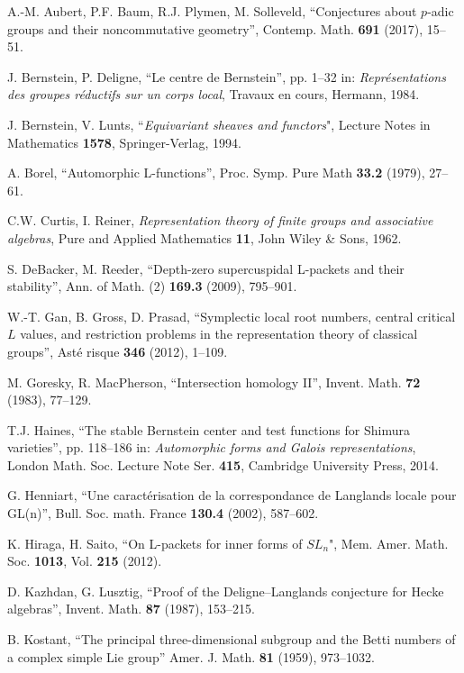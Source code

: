 \documentclass[11pt]{amsart}
\theoremstyle{definition}
\begin{document}
\begin{thebibliography}{99}
 A.-M. Aubert, P.F. Baum, R.J. Plymen, M. Solleveld,
``Conjectures about $p$-adic groups and their noncommutative geometry'',
Contemp. Math. {\bf 691} (2017), 15--51.

 J. Bernstein, P. Deligne,
``Le centre de Bernstein'',
pp. 1--32 in: \emph{Repr\'esentations des groupes r\'eductifs sur un corps local},
Travaux en cours, Hermann, 1984.

 J. Bernstein, V. Lunts,
``\emph{Equivariant sheaves and functors}",
Lecture Notes in Mathematics {\bf 1578}, Springer-Verlag, 1994.

 A. Borel, 
``Automorphic L-functions'',
Proc. Symp. Pure Math {\bf 33.2} (1979), 27--61.

 C.W. Curtis, I. Reiner,
\emph{Representation theory of finite groups and associative algebras},
Pure and Applied Mathematics {\bf 11},
John Wiley \& Sons, 1962.

 S. DeBacker, M. Reeder, 
``Depth-zero supercuspidal L-packets and their stability'', 
Ann. of Math. (2) {\bf 169.3} (2009), 795--901.

 W.-T. Gan, B. Gross, D. Prasad,
``Symplectic local root numbers, central critical $L$ values,
and restriction problems in the representation theory of classical groups'',
Ast\'e risque {\bf 346} (2012), 1--109.

 M. Goresky, R. MacPherson,
``Intersection homology II'',
Invent. Math. {\bf 72} (1983), 77--129.

 T.J. Haines, 
``The stable Bernstein center and test functions for Shimura varieties'',
pp. 118--186 in: \emph{Automorphic forms and Galois representations},
London Math. Soc. Lecture Note Ser. {\bf 415}, Cambridge University Press, 2014.

 G. Henniart, 
``Une caract\'erisation de la correspondance de Langlands locale pour GL(n)'',
Bull. Soc. math. France {\bf 130.4} (2002), 587--602.

 K. Hiraga, H. Saito,
``On L-packets for inner forms of $SL_n$",
Mem. Amer. Math. Soc. {\bf 1013}, Vol. {\bf 215} (2012).

 D. Kazhdan, G. Lusztig,
``Proof of the Deligne--Langlands conjecture for Hecke algebras'',
Invent. Math. {\bf 87} (1987), 153--215.

 B. Kostant, ``The principal three-dimensional subgroup and 
the Betti numbers of a complex simple Lie group''
Amer. J. Math. {\bf 81} (1959), 973--1032.


\end{thebibliography}
\end{document}
